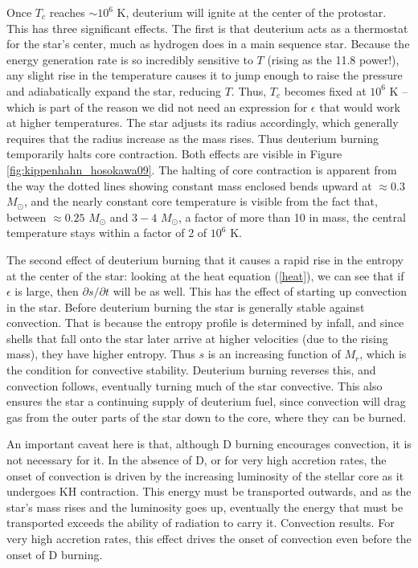 Once $T_c$ reaches $\sim 10^6$ K, deuterium will ignite at the center of the protostar. This has three significant effects. The first is that deuterium acts as a thermostat for the star's center, much as hydrogen does in a main sequence star. Because the energy generation rate is so incredibly sensitive to $T$ (rising as the 11.8 power!), any slight rise in the temperature causes it to jump enough to raise the pressure and adiabatically expand the star, reducing $T$. Thus, $T_c$ becomes fixed at $10^6$ K -- which is part of the reason we did not need an expression for $\epsilon$ that would work at higher temperatures. The star adjusts its radius accordingly, which generally requires that the radius increase as the mass rises. Thus deuterium burning temporarily halts core contraction. Both effects are visible in Figure \ref{fig:kippenhahn_hosokawa09}. The halting of core contraction is apparent from the way the dotted lines showing constant mass enclosed bends upward at $\approx 0.3$ $M_\odot$, and the nearly constant core temperature is visible from the fact that, between $\approx 0.25$ $M_\odot$ and $3-4$ $M_\odot$, a factor of more than 10 in mass, the central temperature stays within a factor of 2 of $10^6$ K.

The second effect of deuterium burning that it causes a rapid rise in the entropy at the center of the star: looking at the heat equation (\ref{heat}), we can see that if $\epsilon$ is large, then $\partial s/\partial t$ will be as well. This has the effect of starting up convection in the star. Before deuterium burning the star is generally stable against convection. That is because the entropy profile is determined by infall, and since shells that fall onto the star later arrive at higher velocities (due to the rising mass), they have higher entropy. Thus $s$ is an increasing function of $M_r$, which is the condition for convective stability. Deuterium burning reverses this, and convection follows, eventually turning much of the star convective. This also ensures the star a continuing supply of deuterium fuel, since convection will drag gas from the outer parts of the star down to the core, where they can be burned.

An important caveat here is that, although D burning encourages convection, it is not necessary for it. In the absence of D, or for very high accretion rates, the onset of convection is driven by the increasing luminosity of the stellar core as it undergoes KH contraction. This energy must be transported outwards, and as the star's mass rises and the luminosity goes up, eventually the energy that must be transported exceeds the ability of radiation to carry it. Convection results. For very high accretion rates, this effect drives the onset of convection even before the onset of D burning.

